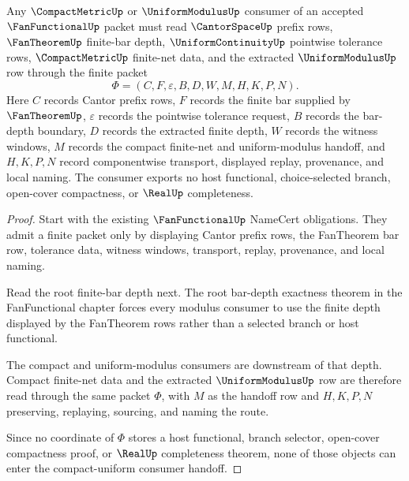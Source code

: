\begin{theorem}
\label{thm:fanfunctional-uniform-modulus-compact-consumer}
Any $\CompactMetricUp$ or $\UniformModulusUp$ consumer of an accepted $\FanFunctionalUp$ packet must read $\CantorSpaceUp$ prefix rows, $\FanTheoremUp$ finite-bar depth, $\UniformContinuityUp$ pointwise tolerance rows, $\CompactMetricUp$ finite-net data, and the extracted $\UniformModulusUp$ row through the finite packet
$$
\Phi=(C,F,\varepsilon,B,D,W,M,H,K,P,N).
$$
Here $C$ records Cantor prefix rows, $F$ records the finite bar supplied by $\FanTheoremUp$, $\varepsilon$ records the pointwise tolerance request, $B$ records the bar-depth boundary, $D$ records the extracted finite depth, $W$ records the witness windows, $M$ records the compact finite-net and uniform-modulus handoff, and $H,K,P,N$ record componentwise transport, displayed replay, provenance, and local naming. The consumer exports no host functional, choice-selected branch, open-cover compactness, or $\RealUp$ completeness.
\end{theorem}
\begin{proof}
Start with the existing $\FanFunctionalUp$ NameCert obligations. They admit a finite packet only by displaying Cantor prefix rows, the FanTheorem bar row, tolerance data, witness windows, transport, replay, provenance, and local naming.

Read the root finite-bar depth next. The root bar-depth exactness theorem in the FanFunctional chapter forces every modulus consumer to use the finite depth displayed by the FanTheorem rows rather than a selected branch or host functional.

The compact and uniform-modulus consumers are downstream of that depth. Compact finite-net data and the extracted $\UniformModulusUp$ row are therefore read through the same packet $\Phi$, with $M$ as the handoff row and $H,K,P,N$ preserving, replaying, sourcing, and naming the route.

Since no coordinate of $\Phi$ stores a host functional, branch selector, open-cover compactness proof, or $\RealUp$ completeness theorem, none of those objects can enter the compact-uniform consumer handoff.
\end{proof}
